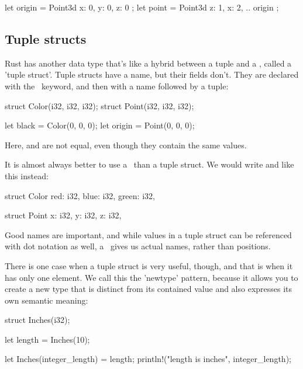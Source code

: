 \begin{rustc}
let origin = Point3d { x: 0, y: 0, z: 0 };
let point = Point3d { z: 1, x: 2, .. origin };
\end{rustc}

\subsection*{Tuple structs}
\label{paragraph:tuple_structs}

Rust has another data type that's like a hybrid between a tuple and a \struct, called a 'tuple struct'. Tuple structs have a name, 
but their fields don't. They are declared with the \struct\ keyword, and then with a name followed by a tuple:

\begin{rustc}
struct Color(i32, i32, i32);
struct Point(i32, i32, i32);

let black = Color(0, 0, 0);
let origin = Point(0, 0, 0);
\end{rustc}

Here,  and  are not equal, even though they contain the same values.

\blank

It is almost always better to use a \struct\ than a tuple struct. We would write  and  like this instead:

\begin{rustc}
struct Color {
    red: i32,
    blue: i32,
    green: i32,
}

struct Point {
    x: i32,
    y: i32,
    z: i32,
}
\end{rustc}

Good names are important, and while values in a tuple struct can be referenced with dot notation as well, a \struct\ gives us 
actual names, rather than positions.

\blank

There is one case when a tuple struct is very useful, though, and that is when it has only one element. We call this the 'newtype' 
pattern, because it allows you to create a new type that is distinct from its contained value and also expresses its own semantic 
meaning:

\begin{rustc}
struct Inches(i32);

let length = Inches(10);

let Inches(integer_length) = length;
println!("length is {} inches", integer_length);
\end{rustc}

